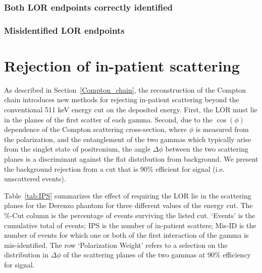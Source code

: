 \documentclass[12pt]{article}
\begin{document}
\subsubsection{Both LOR endpoints correctly identified}

\subsubsection{Misidentified LOR endpoints}

\section{Rejection of in-patient scattering}
\label{In-patient_Scattering}

As described in Section~\ref{Compton_chain}, the reconstruction of the Compton chain introduces new methods for rejecting in-patient scattering beyond the conventional 511 keV energy cut on the deposited energy. First, the LOR must lie in the planes of the first scatter of each gamma. Second, due to the $\cos(\phi)$ dependence of the Compton scattering cross-section, where $\phi$ is measured from the polarization, and the entanglement of the two gammas which typically arise from the singlet state of positronium, the angle $\Delta\phi$ between the two scattering planes
is a discriminant against the flat distribution from background. We present the background rejection from a cut that is 90\% efficient for signal (i.e. unscattered events).

   Table~\ref{tab:IPS} summarizes the effect of requiring the LOR lie in the
scattering planes for the Derenzo phantom for three different values of
the energy cut. The \%-Cut column is the percentage of events surviving
the listed cut. `Events' is the cumulative total of events; IPS is the
number of in-patient scatters; Mis-ID is the number of events for which
one or both of the first interaction of the gamma is mis-identified. The row `Polarization Weight' refers to a selection on the distribution in $\Delta\phi$ of the scattering planes of the two gammas at 90\% efficiency for signal.

\end{document}
